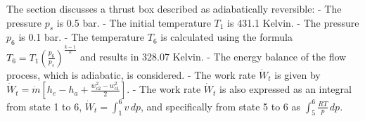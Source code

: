 The section discusses a thrust box described as adiabatically reversible:
- The pressure \( p_s \) is 0.5 bar.
- The initial temperature \( T_1 \) is 431.1 Kelvin.
- The pressure \( p_6 \) is 0.1 bar.
- The temperature \( T_6 \) is calculated using the formula \( T_6 = T_1 \left( \frac{p_6}{p_s} \right)^{\frac{k-1}{k}} \) and results in 328.07 Kelvin.
- The energy balance of the flow process, which is adiabatic, is considered.
- The work rate \( \dot{W}_t \) is given by \( \dot{W}_t = \dot{m} \left[ h_e - h_a + \frac{w_{c2}^2 - w_{c1}^2}{2} \right] \).
- The work rate \( \dot{W}_t \) is also expressed as an integral from state 1 to 6, \( \dot{W}_t = \int_{1}^{6} v \, dp \), and specifically from state 5 to 6 as \( \int_{5}^{6} \frac{R T}{p} \, dp \).